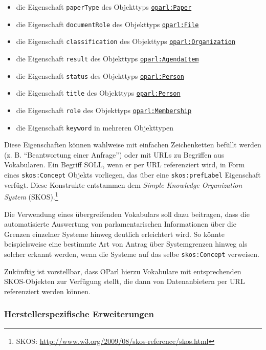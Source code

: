 \documentclass[,a4paper]{article}
\begin{document}
\begin{itemize}
\itemsep1pt\parskip0pt
\item
  die Eigenschaft \texttt{paperType} des Objekttyps
  \hyperref[oparlux5fpaper]{\texttt{oparl:Paper}}
\item
  die Eigenschaft \texttt{documentRole} des Objekttyps
  \hyperref[oparlux5fdocument]{\texttt{oparl:File}}
\item
  die Eigenschaft \texttt{classification} des Objekttyps
  \hyperref[oparlux5forganization]{\texttt{oparl:Organization}}
\item
  die Eigenschaft \texttt{result} des Objekttyps
  \hyperref[oparlux5fagendaitem]{\texttt{oparl:AgendaItem}}
\item
  die Eigenschaft \texttt{status} des Objekttyps
  \hyperref[oparlux5fperson]{\texttt{oparl:Person}}
\item
  die Eigenschaft \texttt{title} des Objekttyps
  \hyperref[oparlux5fperson]{\texttt{oparl:Person}}
\item
  die Eigenschaft \texttt{role} des Objekttyps
  \hyperref[oparlux5fmembership]{\texttt{oparl:Membership}}
\item
  die Eigenschaft \texttt{keyword} in mehreren Objekttypen
\end{itemize}

Diese Eigenschaften können wahlweise mit einfachen Zeichenketten befüllt
werden (z. B. ``Beantwortung einer Anfrage'') oder mit URLs zu Begriffen
aus Vokabularen. Ein Begriff SOLL, wenn er per URL referenziert wird, in
Form eines \texttt{skos:Concept} Objekts vorliegen, das über eine
\texttt{skos:prefLabel} Eigenschaft verfügt. Diese Konstrukte entstammen
dem \emph{Simple Knowledge Organization System} (SKOS).\footnote{SKOS:
  \url{http://www.w3.org/2009/08/skos-reference/skos.html}}

Die Verwendung eines übergreifenden Vokabulars soll dazu beitragen, dass
die automatisierte Auswertung von parlamentarischen Informationen über
die Grenzen einzelner Systeme hinweg deutlich erleichtert wird. So
könnte beispielsweise eine bestimmte Art von Antrag über Systemgrenzen
hinweg als solcher erkannt werden, wenn die Systeme auf das selbe
\texttt{skos:Concept} verweisen.

Zukünftig ist vorstellbar, dass OParl hierzu Vokabulare mit
entsprechenden SKOS-Objekten zur Verfügung stellt, die dann von
Datenanbietern per URL referenziert werden können.

\subsubsection{Herstellerspezifische
Erweiterungen}\label{herstellerspezifische-erweiterungen}
\end{document}
